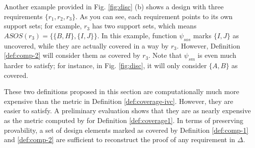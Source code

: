 Another example provided in Fig. \ref{fig:disc} (b) shows a design with
three requirements $\{ r_1, r_2, r_3\}$. As you can see, each requirement points to its
own support sets; for example, $r_3$ has two support sets,
which means $ASOS(r_3) = \{ \{B, H\}, \{I, J\}\}$. In this example,
function $\psi_{sos}$ marks $\{I, J\}$ as uncovered, while they are actually covered in a way by $r_3$.
However, Definition \ref{def:comp-2} will consider them as covered by $r_3$.
Note that $\psi_{sm}$ is even much harder to satisfy; for instance, in Fig. \ref{fig:disc},
it will only consider $\{ A, B\}$ as covered.

These two definitions proposed in this section are computationally much more expensive than the metric in Definition \ref{def:coverage-ivc}. However, they are easier to satisfy. A preliminary evaluation shows that they are as nearly expensive as the metric computed by \mustalg for Definition \ref{def:coverage1}.
In terms of preserving provability, a set of design elements marked as covered by Definition \ref{def:comp-1} and \ref{def:comp-2} are
sufficient to reconstruct the proof of any requirement in $\Delta$.

